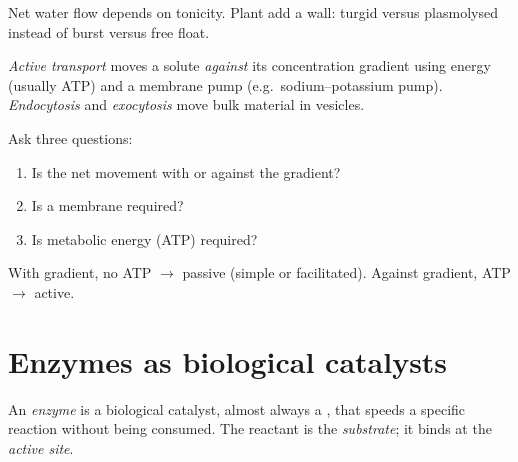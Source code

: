 \begin{omfigure}

{\small Net water flow depends on tonicity. Plant  add a wall: turgid
versus plasmolysed instead of burst versus free float.}
\end{omfigure}

\begin{definition}\label{def:g10:membranes-enzymes:active}
\emph{Active transport} moves a solute
\emph{against} its concentration gradient using energy (usually ATP) and
a membrane  pump (e.g.\ sodium--potassium pump).
\emph{Endocytosis} and
\emph{exocytosis} move bulk material in vesicles.
\end{definition}

\begin{method}\label{met:g10:membranes-enzymes:classify}
Ask three questions:
\begin{enumerate}
  \item Is the net movement with or against the gradient?
  \item Is a membrane  required?
  \item Is metabolic energy (ATP) required?
\end{enumerate}
With gradient, no ATP $\to$ passive (simple or facilitated). Against
gradient, ATP $\to$ active.
\end{method}

\section{Enzymes as biological catalysts}

\begin{definition}[Enzyme]\label{def:g10:membranes-enzymes:enzyme}
An \emph{enzyme} is a biological catalyst, almost always a
, that speeds a specific reaction without being consumed. The
reactant is the \emph{substrate}; it binds at the
\emph{active site}.
\end{definition}

